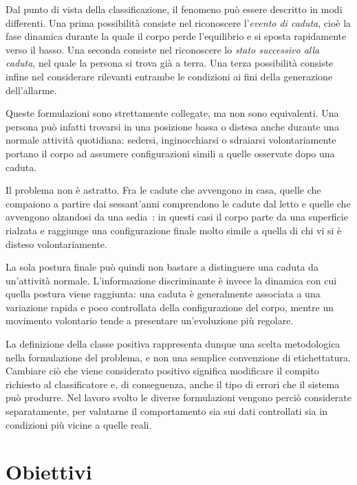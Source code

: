 Dal punto di vista della classificazione, il fenomeno può essere descritto in
modi differenti. Una prima possibilità consiste nel riconoscere l'\emph{evento
di caduta}, cioè la fase dinamica durante la quale il corpo perde l'equilibrio
e si sposta rapidamente verso il basso. Una seconda consiste nel riconoscere
lo \emph{stato successivo alla caduta}, nel quale la persona si trova già a
terra. Una terza possibilità consiste infine nel considerare rilevanti
entrambe le condizioni ai fini della generazione dell'allarme.

Queste formulazioni sono strettamente collegate, ma non sono equivalenti. Una
persona può infatti trovarsi in una posizione bassa o distesa anche durante
una normale attività quotidiana: sedersi, inginocchiarsi o sdraiarsi
volontariamente portano il corpo ad assumere configurazioni simili a quelle
osservate dopo una caduta.

Il problema non è astratto. Fra le cadute che avvengono in casa, quelle che
compaiono a partire dai sessant'anni comprendono le cadute dal letto e quelle
che avvengono alzandosi da una sedia~\cite{epicentro}: in questi casi il
corpo parte da una superficie rialzata e raggiunge una configurazione finale
molto simile a quella di chi vi si è disteso volontariamente.

La sola postura finale può quindi non bastare a distinguere una caduta da
un'attività normale. L'informazione discriminante è invece la dinamica con
cui quella postura viene raggiunta: una caduta è generalmente associata a una
variazione rapida e poco controllata della configurazione del corpo, mentre
un movimento volontario tende a presentare un'evoluzione più regolare.

La definizione della classe positiva rappresenta dunque una scelta
metodologica nella formulazione del problema, e non una semplice convenzione
di etichettatura. Cambiare ciò che viene considerato positivo significa
modificare il compito richiesto al classificatore e, di conseguenza, anche il
tipo di errori che il sistema può produrre. Nel lavoro svolto le diverse
formulazioni vengono perciò considerate separatamente, per valutarne il
comportamento sia sui dati controllati sia in condizioni più vicine a quelle
reali.

\section{Obiettivi}

